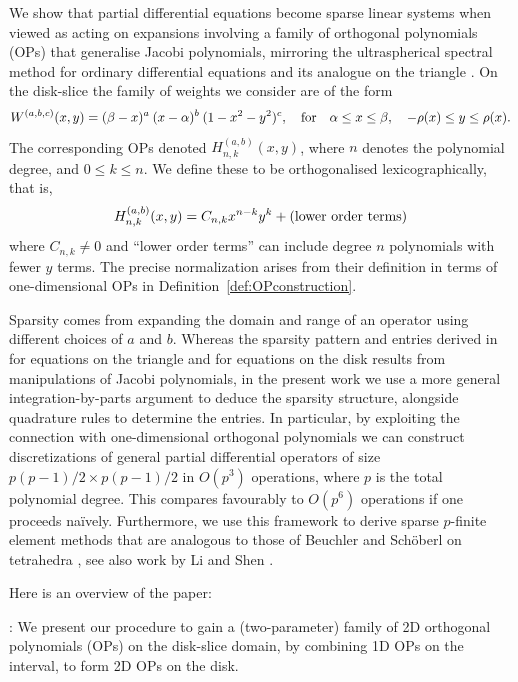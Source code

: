 \documentclass[11pt, oneside]{article}   	%
\newcommand{\sotodoinline}{\todo[color=green,inline=true]}
\newcommand{\bstodo}{\todo[color=pink]}
\newcommand{\hdop}{H}
\newcommand{\hdopnkab}{\hdop_{n,k}^{(a,b)}}
\newcommand{\Wabc}{{W^{(a,b,c)}}}
\begin{document}
We show that partial differential equations become sparse linear systems when viewed as acting on expansions involving a family of orthogonal polynomials (OPs) that  generalise Jacobi polynomials, mirroring the ultraspherical spectral method for ordinary differential equations \cite{olver2013fast} and its analogue on the triangle \cite{olver2018recurrence,olver2019triangle}.  On the disk-slice the family of weights we consider are of the form
$$
\Wabc(x,y) = (\beta - x)^a \: (x - \alpha)^b \: (1-x^2-y^2)^c, \qfor \alpha \leq x \leq \beta,\quad -\rho(x) \leq y \leq \rho(x).
$$
The corresponding OPs denoted $\hdopnkab(x,y)$, where $n$ denotes the polynomial degree, and $0 \le k \le n$. We define these to be orthogonalised lexicographically, that is,
$$
\hdopnkab(x,y) = C_{n,k} x^{n-k} y^k + (\hbox{lower order terms})
$$
where $C_{n,k} \neq 0$ and ``lower order terms'' can  include degree $n$ polynomials with fewer $y$ terms. The precise normalization arises from their definition in terms of one-dimensional OPs in Definition~\ref{def:OPconstruction}. 

Sparsity comes from expanding the domain and range of an operator  using different choices of $a$ and $b$. Whereas the sparsity pattern and entries derived in \cite{olver2018recurrence,olver2019triangle} for equations on the triangle  and \cite{vasil2016tensor} for equations on the disk results from manipulations of Jacobi polynomials, in the present work we use a more general integration-by-parts argument to deduce the sparsity structure, alongside quadrature rules to determine the entries.  In particular, by exploiting the connection with one-dimensional orthogonal polynomials \bstodo{typo 2}we can construct discretizations of general partial differential operators of size $p(p-1)/2 \times p(p-1)/2$ in $O(p^3)$ operations, where $p$ is the total polynomial degree. This compares favourably to $O(p^6)$ operations if one proceeds na\"ively. Furthermore, we use this framework to derive sparse $p$-finite element methods that are analogous to those of Beuchler and Sch\"oberl on tetrahedra \cite{beuchler2006new}, see also work by Li and Shen \cite{li2010optimal}.  



Here is an overview of the paper:  

\noindent {}: We present our procedure to gain a (two-parameter) family of 2D orthogonal polynomials (OPs) on the disk-slice domain, by combining 1D OPs on the interval, to form 2D OPs on the disk. 
\end{document}
